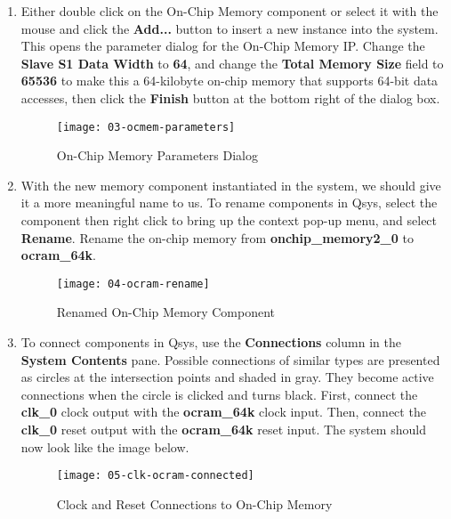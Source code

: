 \begin{flushleft}
\begin{enumerate}[
	label=\textbf{Step \arabic*.},
	leftmargin=*,
	widest={00},
	align=left]
\newpage

\item Either double click on the On-Chip Memory component or select it with the mouse and click the \textbf{Add...} button to insert a new instance into the system.  This opens the parameter dialog for the On-Chip Memory IP.  Change the \textbf{Slave S1 Data Width} to \textbf{64}, and change the \textbf{Total Memory Size} field to \textbf{65536} to make this a 64-kilobyte on-chip memory that supports 64-bit data accesses, then click the \textbf{Finish} button at the bottom right of the dialog box.

\begin{figure}[H]
\centering
\texttt{[image: 03-ocmem-parameters]}
\caption{On-Chip Memory Parameters Dialog}
\label{fig:03-ocmem-parameters}
\end{figure}

\newpage

\item With the new memory component instantiated in the system, we should give it a more meaningful name to us.  To rename components in Qsys, select the component then right click to bring up the context pop-up menu, and select \textbf{Rename}.  Rename the on-chip memory from \textbf{onchip\_memory2\_0} to \textbf{ocram\_64k}.

\begin{figure}[H]
\centering
\texttt{[image: 04-ocram-rename]}
\caption{Renamed On-Chip Memory Component}
\label{fig:04-ocram-rename}
\end{figure}

\item To connect components in Qsys, use the \textbf{Connections} column in the \textbf{System Contents} pane.  Possible connections of similar types are presented as circles at the intersection points and shaded in gray.  They become active connections when the circle is clicked and turns black.  First, connect the \textbf{clk\_0} clock output with the \textbf{ocram\_64k} clock input.  Then, connect the \textbf{clk\_0} reset output with the \textbf{ocram\_64k} reset input.   The system should now look like the image below.

\begin{figure}[H]
\centering
\texttt{[image: 05-clk-ocram-connected]}
\caption{Clock and Reset Connections to On-Chip Memory}
\label{fig:05-clk-ocram-connected}
\end{figure}


\end{enumerate}
\end{flushleft}
